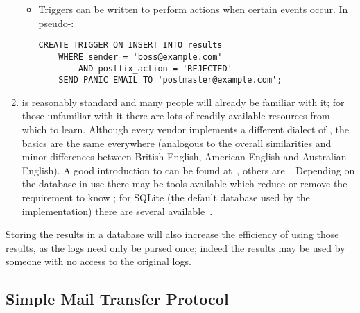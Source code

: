 \documentclass[a4paper,12pt,draft]{article}
\begin{document}
\begin{enumerate}
\begin{itemize}
            \item Triggers can be written to perform actions when certain
                events occur.  In pseudo-\SQL{}\@:

\begin{verbatim}
CREATE TRIGGER ON INSERT INTO results
    WHERE sender = 'boss@example.com'
        AND postfix_action = 'REJECTED'
    SEND PANIC EMAIL TO 'postmaster@example.com';
\end{verbatim}

        \end{itemize}


    \item \SQL{} is reasonably standard and many people will already be
        familiar with it; for those unfamiliar with it there are lots of
        readily available resources from which to learn.  Although every
        vendor implements a different dialect of \SQL{}, the basics are the
        same everywhere (analogous to the overall similarities and minor
        differences between British English, American English and
        Australian English).  A good introduction to \SQL{} can be found
        at~\cite{sql-for-web-nerds}, others
        are~\cite{w3schools-sql-tutorial, sqlcourse.com}.  Depending on the
        database in use there may be tools available which reduce or remove
        the requirement to know \SQL{}; for SQLite (the default database
        used by the implementation) there are several
        available~\cite{sqlite-guis}.

\end{enumerate}

Storing the results in a database will also increase the efficiency of
using those results, as the logs need only be parsed once; indeed the
results may be used by someone with no access to the original logs.



\subsection{Simple Mail Transfer Protocol}
\label{SMTP background}
\end{document}
